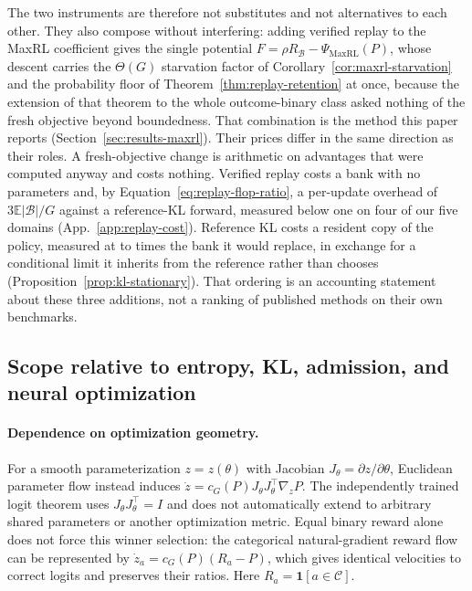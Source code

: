 \documentclass{article}
\newcommand{\1}{\mathbf 1}
\newcommand{\E}{\mathbb E}
\theoremstyle{remark}
\theoremstyle{definition}
\theoremstyle{plain}
\begin{document}
The two instruments are therefore not substitutes and not alternatives to each
other. They also compose without interfering: adding verified replay to the
MaxRL coefficient gives the single potential
$F=\rho R_{\mathcal B}-\Psi_{\mathrm{MaxRL}}(P)$, whose descent carries the
$\Theta(G)$ starvation factor of Corollary~\ref{cor:maxrl-starvation} and the
probability floor of Theorem~\ref{thm:replay-retention} at once, because the
extension of that theorem to the whole outcome-binary class asked nothing of
the fresh objective beyond boundedness. That combination is the method this
paper reports (Section~\ref{sec:results-maxrl}). Their prices differ in the same direction as
their roles. A fresh-objective change is arithmetic on advantages that were
computed anyway and costs nothing. Verified replay costs a bank with no
parameters and, by Equation~\eqref{eq:replay-flop-ratio}, a per-update
overhead of $3\E|\mathcal B|/G$ against a reference-KL forward, measured below
one on four of our five domains (App.~\ref{app:replay-cost}). Reference KL
costs a resident copy of the policy, measured at \MDcostStateMin{} to
\MDcostStateMax{} times the bank it would replace, in exchange for a
conditional limit it inherits from the reference rather than chooses
(Proposition~\ref{prop:kl-stationary}). That ordering is an accounting
statement about these three additions, not a ranking of published methods on
their own benchmarks.

\subsection{Scope relative to entropy, KL, admission, and neural optimization}
\label{app:theory-entropy}
\label{app:theory-entropy-comparison}

\paragraph{Dependence on optimization geometry.}
For a smooth parameterization $z=z(\theta)$ with Jacobian
$J_\theta=\partial z/\partial\theta$, Euclidean parameter flow instead
induces $\dot z=c_G(P)J_\theta J_\theta^\top\nabla_zP$. The independently
trained logit theorem uses $J_\theta J_\theta^\top=I$ and does not automatically
extend to arbitrary shared parameters or another optimization metric. Equal
binary reward alone does not force this winner selection: the categorical
natural-gradient reward flow can be represented by
$\dot z_a=c_G(P)(R_a-P)$, which gives identical velocities to correct logits
and preserves their ratios. Here $R_a=\1[a\in\mathcal C]$.
\end{document}
